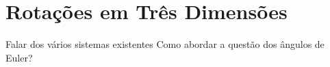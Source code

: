 \chapter{Rotações em Três Dimensões} \label{app:three_dimensional_rotation}

\alert{Falar dos vários sistemas existentes}
\alert{Como abordar a questão dos ângulos de Euler?}
